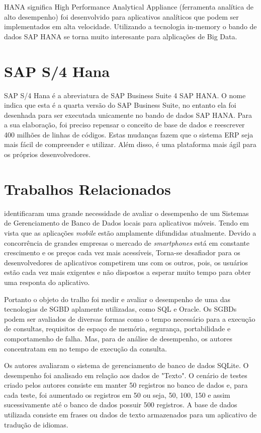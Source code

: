 HANA significa High Performance Analytical Appliance (ferramenta analítica de alto desempenho) foi desenvolvido para aplicativos analíticos que podem ser implementados em alta velocidade. Utilizando a tecnologia in-memory o bando de dados SAP HANA se torna muito interesante para alplicações de Big Data. \cite{pelissari}

\section{SAP S/4 Hana}

SAP S/4 Hana é a abreviatura de SAP Business Suite 4 SAP HANA. O nome indica que esta é a quarta versão do SAP Business Suite, no entanto ela foi desenhada para ser executada unicamente no bando de dados SAP HANA. Para a sua elaboração, foi preciso repensar o conceito de base de dados e reescrever 400 milhões de linhas de códigos. Estas mudanças fazem que o sistema ERP seja mais fácil de compreender e utilizar. Além disso, é uma plataforma mais ágil para os próprios desenvolvedores. \cite{cienci}


\section{Trabalhos Relacionados}

 identificaram uma grande necessidade de avaliar o desempenho de um Sistemas de Gerenciamento de Banco de Dados locais para aplicativos móveis. Tendo em vista que as aplicações \textit{mobile} estão amplamente difundidas atualmente. 
Devido a concorrência de grandes empresas o mercado de \textit{smartphones} está em constante crescimento e os preços cada vez mais acessíveis, Torna-se desafiador para os desenvolvedores de aplicativos competirem uns com os outros, pois, os usuários estão cada vez mais exigentes e não dispostos a esperar muito tempo para obter uma responta do aplicativo. 

Portanto o objeto do tralho foi medir e avaliar o desempenho de uma das tecnologias de SGBD aplamente utilizadas, como SQL e Oracle. Os SGBDs podem ser avaliados de diversas formas como o tempo necessário para a execução de consultas, requisitos de espaço de memória, segurança, portabilidade e comportamenho de falha. Mas, para de análise de desempenho, os autores concentratam em no tempo de execução da consulta. 

Os autores avaliaram o sistema de gerenciamento de banco de dados SQLite. O desempenho foi analisado em relação aos dados de "Texto". O cenário de testes criado pelos autores consiste em manter 50 registros no banco de dados e, para cada teste, foi aumentado os registros em 50 ou seja, 50, 100, 150 e assim sucessivamente até o banco de dados possuir 500 registros. A base de dados utilizada consiste em frases ou dados de texto armazenados para um aplicativo de tradução de idiomas. 

